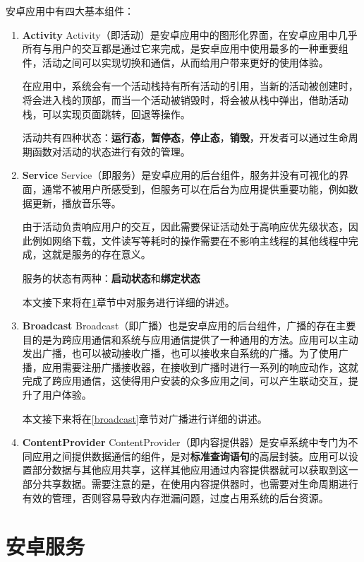 安卓应用中有四大基本组件：
\begin{enumerate}
	\item \textbf{Activity } Activity（即活动）是安卓应用中的图形化界面，在安卓应用中几乎所有与用户的交互都是通过它来完成，是安卓应用中使用最多的一种重要组件，活动之间可以实现切换和通信，从而给用户带来更好的使用体验。
	
	在应用中，系统会有一个活动栈持有所有活动的引用，当新的活动被创建时，将会进入栈的顶部，而当一个活动被销毁时，将会被从栈中弹出，借助活动栈，可以实现页面跳转，回退等操作。
	
	活动共有四种状态：\textbf{运行态}，\textbf{暂停态}，\textbf{停止态}，\textbf{销毁}，开发者可以通过生命周期函数对活动的状态进行有效的管理。
	
	\item \textbf{Service } Service（即服务）是安卓应用的后台组件，服务并没有可视化的界面，通常不被用户所感受到，但服务可以在后台为应用提供重要功能，例如数据更新，播放音乐等。
	
	由于活动负责响应用户的交互，因此需要保证活动处于高响应优先级状态，因此例如网络下载，文件读写等耗时的操作需要在不影响主线程的其他线程中完成，这就是服务的存在意义。
	
	服务的状态有两种：\textbf{启动状态}和\textbf{绑定状态}
	
	本文接下来将在\ref{service}章节中对服务进行详细的讲述。
	
	\item \textbf{Broadcast } Broadcast（即广播）也是安卓应用的后台组件，广播的存在主要目的是为跨应用通信和系统与应用通信提供了一种通用的方法。应用可以主动发出广播，也可以被动接收广播，也可以接收来自系统的广播。为了使用广播，应用需要注册广播接收器，在接收到广播时进行一系列的响应动作，这就完成了跨应用通信，这使得用户安装的众多应用之间，可以产生联动交互，提升了用户体验。
	
	本文接下来将在\ref{broadcast}章节对广播进行详细的讲述。
	
	\item \textbf{ContentProvider } ContentProvider（即内容提供器）是安卓系统中专门为不同应用之间提供数据通信的组件，是对\textbf{标准查询语句}的高层封装。应用可以设置部分数据与其他应用共享，这样其他应用通过内容提供器就可以获取到这一部分共享数据。需要注意的是，在使用内容提供器时，也需要对生命周期进行有效的管理，否则容易导致内存泄漏问题，过度占用系统的后台资源。
\end{enumerate}
\section{安卓服务}\label{service}

